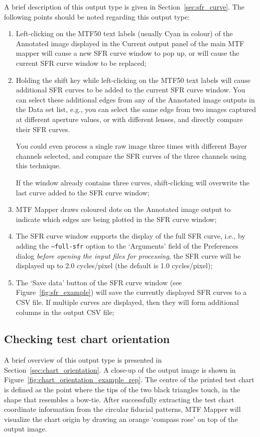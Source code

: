 \documentclass[a4paper]{article}
\begin{document}
A brief description of this output type is given in
Section~\ref{sec:sfr_curve}. The following points should be noted regarding
this output type:
\begin{enumerate}
\item 
Left-clicking on the MTF50 text labels (usually Cyan in colour) of the \textsf{Annotated image}
displayed in the \textsf{Current output} panel of the main MTF mapper will
cause a new SFR curve window to pop up, or will cause the current SFR curve
window to be replaced;
\item
Holding the shift key while left-clicking on the MTF50 text labels will
cause additional SFR curves to be added to the current SFR curve window. You
can select these additional edges from any of the \textsf{Annotated image}
outputs in the Data set list, e.g., you can select the same edge from two
images captured at different aperture values, or with different lenses, and
directly compare their SFR curves.

You could even process a single raw image three times with different Bayer
channels selected, and compare the SFR curves of the three channels 
using this technique.

If the window already contains three curves, shift-clicking will overwrite the
last curve added to the SFR curve window;
\item
MTF Mapper draws coloured dots on the \textsf{Annotated image}
output to indicate which edges are being plotted in the SFR curve window;
\item
The SFR curve window supports the display of the full SFR curve, i.e., by
adding the \texttt{--full-sfr} option to the `Arguments' field of the
\textsf{Preferences} dialog \emph{before opening the input files for
processing}, the SFR curve will be displayed up to 2.0 cycles/pixel (the
default is 1.0 cycles/pixel);
\item
The `Save data' button of the SFR curve window (see
Figure~\ref{fig:sfr_example}) will save the currently displayed SFR curves
to a CSV file. If multiple curves are displayed, then they will form
additional columns in the output CSV file;
\end{enumerate}

\subsection{Checking test chart orientation}
\label{sec:chart_orientation_details}
A brief overview of this output type is presented in
Section~\ref{sec:chart_orientation}. 
A close-up of the output image is shown in Figure~\ref{fig:chart_orientation_example_rep}.
The centre of the printed test chart is defined as the point where the tips
of the two black triangles touch, in the shape that resembles a bow-tie.
After successfully extracting the test chart coordinate information from the
circular fiducial patterns, MTF Mapper will visualize the chart origin by drawing
an orange `compass rose' on top of the output image.
\end{document}
